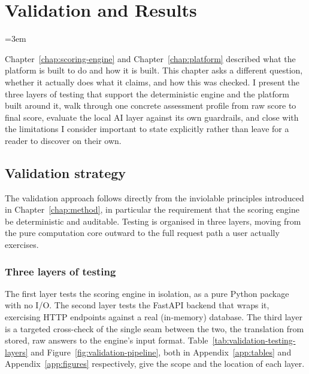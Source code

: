 \chapter{Validation and Results}
\label{chap:validation}
\emergencystretch=3em\relax

Chapter~\ref{chap:scoring-engine} and Chapter~\ref{chap:platform} described
what the platform is built to do and how it is built. This chapter asks a different question, whether it actually does what
it claims, and how this was checked. I present the three layers of testing
that support the deterministic engine and the platform built around it, walk
through one concrete assessment profile from raw score to final score,
evaluate the local AI layer against its own guardrails, and close with the
limitations I consider important to state explicitly rather than leave for a
reader to discover on their own.

\section{Validation strategy}
\label{sec:validation-strategy}

The validation approach follows directly from the inviolable principles
introduced in Chapter~\ref{chap:method}, in particular the requirement
that the scoring engine be deterministic and auditable. Testing is organised
in three layers, moving from the pure computation core outward to the full
request path a user actually exercises.

\subsection{Three layers of testing}
\label{sec:validation-three-layers}

The first layer tests the scoring engine in isolation, as a pure Python
package with no I/O. The second layer tests the FastAPI backend that wraps
it, exercising HTTP endpoints against a real (in-memory) database. The third
layer is a targeted cross-check of the single seam between the two, the
translation from stored, raw answers to the engine's input format. Table~\ref{tab:validation-testing-layers} and Figure~\ref{fig:validation-pipeline}, both in Appendix~\ref{app:tables} and Appendix~\ref{app:figures} respectively, give the scope and the location of each layer.


